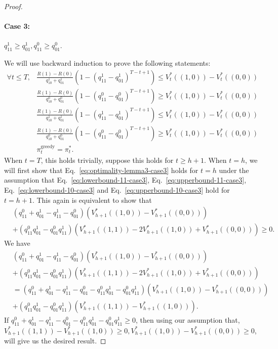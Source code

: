 \begin{proof}
\paragraph{Case 3:} $q^1_{11}\geq q^1_{01}, q^0_{11}\geq q^0_{01}$. 

We will use backward induction to prove the following statements:
\begin{align}
    \forall t\leq T, &\frac{R(1)-R(0)}{q^1_{10}+q^1_{01}}\left(1-\left(q^1_{11}-q^1_{01}\right)^{T-t+1}\right)\leq V_t^*\left((1,0)\right)-V_t^*((0,0))\label{eq:lowerbound-11-case3}\\
    &\frac{R(1)-R(0)}{q^0_{10}+q^0_{01}}\left(1-\left(q^0_{11}-q^0_{01}\right)^{T-t+1}\right)\geq V_t^*\left((1,0)\right)-V_t^*((0,0))\label{eq:upperbound-11-case3}\\
    &\frac{R(1)-R(0)}{q^1_{10}+q^1_{01}}\left(1-\left(q^1_{11}-q^1_{01}\right)^{T-t+1}\right)\leq V_t^*\left((1,0)\right)-V_t^*((0,0))\label{eq:lowerbound-10-case3}\\
    &\frac{R(1)-R(0)}{q^0_{10}+q^0_{01}}\left(1-\left(q^0_{11}-q^0_{01}\right)^{T-t+1}\right)\geq V_t^*\left((1,0)\right)-V_t^*((0,0))\label{eq:upperbound-10-case3}\\
    &\pi_{t}^{\text{greedy}}=\pi_{t}^*.\label{eq:optimality-lemma3-case3}
\end{align}
When $t=T$, this holds trivially, suppose this holds for $t\geq h+1$. When $t=h$, we will first show that Eq.~\eqref{eq:optimality-lemma3-case3} holds for $t=h$ under the assumption that Eq.~\eqref{eq:lowerbound-11-case3}, Eq.~\eqref{eq:upperbound-11-case3}, Eq.~\eqref{eq:lowerbound-10-case3} and Eq.~\eqref{eq:upperbound-10-case3} hold for $t=h+1$. This again is equivalent to show that
\begin{align*}
    &\left(q^0_{11}+q^1_{01}-q^1_{11}-q^0_{01}\right)\left(V_{h+1}^*\left((1,0)\right)-V_{h+1}^*\left((0,0)\right)\right)\\&+\left(q^0_{11}q^1_{01}-q^0_{01}q^1_{11}\right)\left(V_{h+1}^*\left((1,1)\right)-2V_{h+1}^*\left((1,0)\right)+V_{h+1}^*\left((0,0)\right)\right)\geq 0.
\end{align*}
We have
\begin{align*}
    &\left(q^0_{11}+q^1_{01}-q^1_{11}-q^0_{01}\right)\left(V_{h+1}^*\left((1,0)\right)-V_{h+1}^*\left((0,0)\right)\right)\\&+\left(q^0_{11}q^1_{01}-q^0_{01}q^1_{11}\right)\left(V_{h+1}^*\left((1,1)\right)-2V_{h+1}^*\left((1,0)\right)+V_{h+1}^*\left((0,0)\right)\right)\\
    &=\left(q^0_{11}+q^1_{01}-q^1_{11}-q^0_{01}-q^0_{11}q^1_{01}-q^0_{01}q^1_{11}\right)\left(V_{h+1}^*\left((1,0)\right)-V_{h+1}^*\left((0,0)\right)\right)\\
    &+\left(q^0_{11}q^1_{01}-q^0_{01}q^1_{11}\right)\left(V_{h+1}^*\left((1,1)\right)-V_{h+1}^*\left((1,0)\right)\right).
\end{align*}
If $q^0_{11}+q^1_{01}-q^1_{11}-q^0_{01}-q^0_{11}q^1_{01}-q^0_{01}q^1_{11}\geq 0$, then using our assumption that, $V_{h+1}^*\left((1,1)\right)-V_{h+1}^*\left((1,0)\right)\geq 0, V_{h+1}^*\left((1,0)\right)-V_{h+1}^*\left((0,0)\right)\geq 0$, will give us the desired result.


\end{proof}
